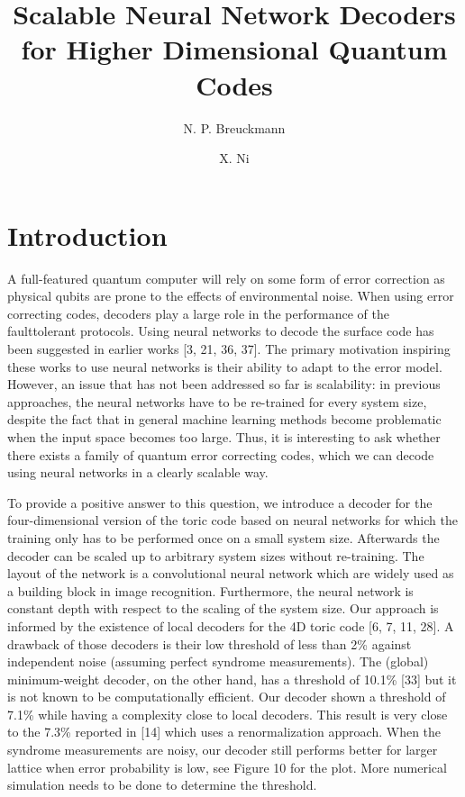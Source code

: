\documentclass[]{compositionalityarticle}
\title{Scalable Neural Network Decoders for Higher Dimensional Quantum Codes}
\author[1]{N. P. Breuckmann}
\author[1,2]{X. Ni}
\affil[1]{Institute for Quantum Information, RWTH Aachen University, Germany}
\affil[2]{Max Planck Institute of Quantum Optics, Germany}
\begin{document}
\maketitle

\section{Introduction}
\merriweatherlight

A full-featured quantum computer will rely on some form of error correction as physical qubits are prone to the effects of environmental noise. When using error correcting codes, decoders play a large role in the performance of the faulttolerant protocols. Using neural networks to decode the surface code has been suggested in earlier works [3, 21, 36, 37]. The primary motivation inspiring these works to use neural networks is their ability to adapt to the error model. However, an issue that has not been addressed so far is scalability: in previous approaches, the neural networks have to be re-trained for every system size, despite the fact that in general machine learning methods become problematic when the input space becomes too large. Thus, it is interesting to ask whether there exists a family of quantum error correcting codes, which we can decode using neural networks in a clearly scalable way.

To provide a positive answer to this question, we introduce a decoder for the four-dimensional version of the toric code based on neural networks for which the training only has to be performed once on a small system size. Afterwards the decoder can be scaled up to arbitrary system sizes without re-training. The layout of the network is a convolutional neural network which are widely used as a building block in image recognition. Furthermore, the neural network is constant depth with respect to
the scaling of the system size. Our approach is informed by the existence of local decoders for the 4D toric code [6, 7, 11, 28]. A drawback of those decoders is their low threshold of less than 2\% against independent noise (assuming perfect syndrome measurements). The (global) minimum-weight decoder, on the other hand, has a threshold of 10.1\% [33] but it is not known to be computationally efficient. Our decoder shown a threshold of 7.1\% while having a complexity close to local decoders.
This result is very close to the 7.3\% reported in [14] which uses a renormalization approach. When the syndrome measurements are noisy, our decoder still performs better for larger lattice when error probability is low, see Figure 10 for the plot. More numerical simulation needs to be done to determine the threshold. 
\end{document}
